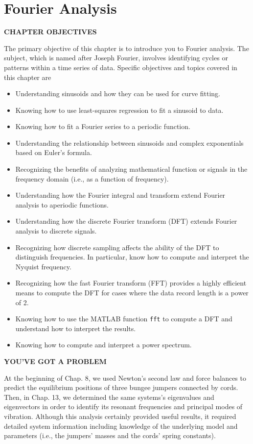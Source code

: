 \documentclass[../main.tex]{subfiles}
\begin{document}
\chapter{Fourier Analysis}
\textbf{CHAPTER OBJECTIVES}

\noindent The primary objective of this chapter is to introduce you to Fourier analysis. The
subject, which is named after Joseph Fourier, involves identifying cycles or patterns
within a time series of data. Specific objectives and topics covered in this chapter are

\begin{itemize}
	\item Understanding sinusoids and how they can be used for curve fitting.
	\item Knowing how to use least-squares regression to fit a sinusoid to data.
	\item Knowing how to fit a Fourier series to a periodic function.
	\item Understanding the relationship between sinusoids and complex exponentials
	based on Euler's formula.
	\item Recognizing the benefits of analyzing mathematical function or signals in the frequency domain (i.e., as a function of frequency).
	\item Understanding how the Fourier integral and transform extend Fourier analysis to aperiodic functions.
	\item Understanding how the discrete Fourier transform (DFT) extends Fourier analysis
	to discrete signals.
	\item Recognizing how discrete sampling affects the ability of the DFT to distinguish
	frequencies. In particular, know how to compute and interpret the Nyquist
	frequency.
	\item Recognizing how the fast Fourier transform (FFT) provides a highly efficient
	means to compute the DFT for cases where the data record length is a power of 2.
	\item Knowing how to use the MATLAB function \texttt{fft} to compute a DFT and
	understand how to interpret the results.
	\item Knowing how to compute and interpret a power spectrum.
\end{itemize}

\noindent\textbf{YOU'VE GOT A PROBLEM}

\noindent At the beginning of Chap. 8, we used Newton's second law and force balances to predict the equilibrium positions of three bungee jumpers connected by cords. Then, in Chap. 13, we determined the same systems's eigenvalues and eigenvectors in order to identify its resonant frequencies and principal modes of vibration.
Although this analysis certainly provided useful results, it required detailed system information including
knowledge of the underlying model and parameters (i.e., the jumpers' masses and the
cords' spring constants).
\end{document}
